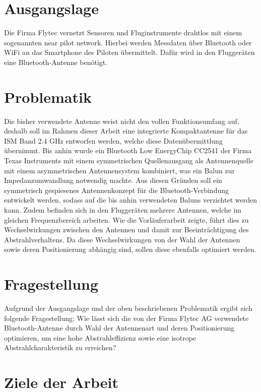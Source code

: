 \section{Ausgangslage}
Die Firma Flytec vernetzt Sensoren und Fluginstrumente drahtlos mit einem sogenannten \glqq near pilot network\grqq. Hierbei werden Messdaten über Bluetooth oder WiFi an das Smartphone des Piloten übermittelt. Dafür wird in den Fluggeräten eine Bluetooth-Antenne benötigt. 

\section{Problematik}
Die bisher verwendete Antenne weist nicht den vollen Funktionsumfang auf, deshalb soll im Rahmen dieser Arbeit eine integrierte Kompaktantenne für das ISM Band 2.4 GHz entworfen werden, welche diese Datenübermittlung übernimmt. Bis anhin wurde ein \glqq Bluetooth Low Energy\grqq Chip CC2541 der Firma Texas Instruments mit einem symmetrischen Quellenausgang als Antennenquelle mit einem asymmetrischen  Antennensystem kombiniert, was ein Balun zur Impedanzumwandlung notwendig machte.  Aus diesen Gründen soll ein symmetrisch gespiesenes Antennenkonzept für die Bluetooth-Verbindung entwickelt werden, sodass auf die bis anhin verwendeten Baluns verzichtet werden kann. Zudem befinden sich in den Fluggeräten mehrere Antennen, welche im gleichen Frequenzbereich arbeiten. Wie die Vorläuferarbeit zeigte, führt dies zu Wechselwirkungen zwischen den Antennen und damit zur Beeinträchtigung des Abstrahlverhaltens. Da diese Wechselwirkungen von der Wahl der Antennen sowie deren Positionierung abhängig sind, sollen diese ebenfalls optimiert werden. 

\section{Fragestellung}
Aufgrund der Ausgangslage und der oben beschriebenen Problematik ergibt sich folgende Fragestellung: 
Wie lässt sich die von der Firma Flytec AG verwendete Bluetooth-Antenne durch Wahl der Antennenart und deren Positionierung optimieren, um eine hohe Abstrahleffizienz sowie eine isotrope Abstrahlcharakteristik zu erreichen?



\section{Ziele der Arbeit}

